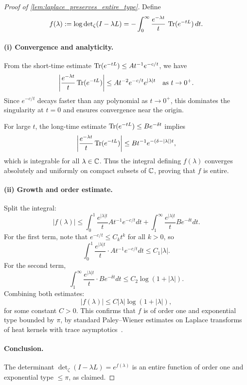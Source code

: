 \begin{proof}[Proof of \cref{lem:laplace_preserves_entire_type}]
Define
\[
f(\lambda) := \log \det\nolimits_\zeta(I - \lambda L)
= - \int_0^\infty \frac{e^{-\lambda t}}{t} \, \operatorname{Tr}(e^{-tL}) \, dt.
\]

\paragraph{(i) Convergence and analyticity.}
From the short-time estimate \( \operatorname{Tr}(e^{-tL}) \le A t^{-1} e^{-c/t} \), we have
\[
\left| \frac{e^{-\lambda t}}{t} \operatorname{Tr}(e^{-tL}) \right| \le A t^{-2} e^{-c/t} e^{|\lambda| t}
\quad \text{as } t \to 0^+.
\]
Since \( e^{-c/t} \) decays faster than any polynomial as \( t \to 0^+ \), this dominates the singularity at \( t = 0 \) and ensures convergence near the origin.

For large \( t \), the long-time estimate \( \operatorname{Tr}(e^{-tL}) \le B e^{-\delta t} \) implies
\[
\left| \frac{e^{-\lambda t}}{t} \operatorname{Tr}(e^{-tL}) \right| \le B t^{-1} e^{-(\delta - |\lambda|) t},
\]
which is integrable for all \( \lambda \in \mathbb{C} \). Thus the integral defining \( f(\lambda) \) converges absolutely and uniformly on compact subsets of \( \mathbb{C} \), proving that \( f \) is entire.

\paragraph{(ii) Growth and order estimate.}
Split the integral:
\[
|f(\lambda)| \le \int_0^1 \frac{e^{|\lambda| t}}{t} A t^{-1} e^{-c/t} dt
+ \int_1^\infty \frac{e^{|\lambda| t}}{t} B e^{-\delta t} dt.
\]
For the first term, note that \( e^{-c/t} \le C_k t^k \) for all \( k > 0 \), so
\[
\int_0^1 \frac{e^{|\lambda| t}}{t} \cdot A t^{-1} e^{-c/t} dt \le C_1 |\lambda|.
\]
For the second term,
\[
\int_1^\infty \frac{e^{|\lambda| t}}{t} \cdot B e^{-\delta t} dt \le C_2 \log(1 + |\lambda|).
\]
Combining both estimates:
\[
|f(\lambda)| \le C |\lambda| \log(1 + |\lambda|),
\]
for some constant \( C > 0 \). This confirms that \( f \) is of order one and exponential type bounded by \( \pi \), by standard Paley--Wiener estimates on Laplace transforms of heat kernels with trace asymptotics~\cite[Ch.~9]{Levin1996EntireLectures}.

\paragraph{Conclusion.}
The determinant \( \det\nolimits_\zeta(I - \lambda L) = e^{f(\lambda)} \) is an entire function of order one and exponential type \( \le \pi \), as claimed.
\end{proof}
